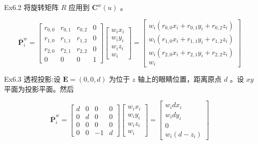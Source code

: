 \documentclass[../main.tex]{subfiles}
\begin{document}
Ex6.2 将旋转矩阵 \(R\) 应用到 \({\mathbf{C}}^{w}\left( u\right)\) 。

\[
{\bar{\mathbf{P}}}_{i}^{w} = \left\lbrack  \begin{matrix} {r}_{0,0} & {r}_{0,1} & {r}_{0,2} & 0 \\  {r}_{1,0} & {r}_{1,1} & {r}_{1,2} & 0 \\  {r}_{2,0} & {r}_{2,1} & {r}_{2,2} & 0 \\  0 & 0 & 0 & 1 \end{matrix}\right\rbrack  \left\lbrack  \begin{matrix} {w}_{i}{x}_{i} \\  {w}_{i}{y}_{i} \\  {w}_{i}{z}_{i} \\  {w}_{i} \end{matrix}\right\rbrack   = \left\lbrack  \begin{matrix} {w}_{i}\left( {{r}_{0,0}{x}_{i} + {r}_{0,1}{y}_{i} + {r}_{0,2}{z}_{i}}\right) \\  {w}_{i}\left( {{r}_{1,0}{x}_{i} + {r}_{1,1}{y}_{i} + {r}_{1,2}{z}_{i}}\right) \\  {w}_{i}\left( {{r}_{2,0}{x}_{i} + {r}_{2,1}{y}_{i} + {r}_{2,2}{z}_{i}}\right) \\  {w}_{i} \end{matrix}\right\rbrack
\]

Ex6.3 透视投影:设 \(\mathbf{E} = \left( {0,0,d}\right)\) 为位于 \(z\) 轴上的眼睛位置，距离原点 \(d\) 。设 \({xy}\) 平面为投影平面。然后

\[
{\overline{\mathbf{P}}}_{i}^{w} = \left\lbrack  \begin{array}{rrrr} d & 0 & 0 & 0 \\  0 & d & 0 & 0 \\  0 & 0 & 0 & 0 \\  0 & 0 &  - 1 & d \end{array}\right\rbrack  \left\lbrack  \begin{matrix} {w}_{i}{x}_{i} \\  {w}_{i}{y}_{i} \\  {w}_{i}{z}_{i} \\  {w}_{i} \end{matrix}\right\rbrack   = \left\lbrack  \begin{matrix} {w}_{i}d{x}_{i} \\  {w}_{i}d{y}_{i} \\  0 \\  {w}_{i}\left( {d - {z}_{i}}\right)  \end{matrix}\right\rbrack   \tag{6.23}
\]
\end{document}
